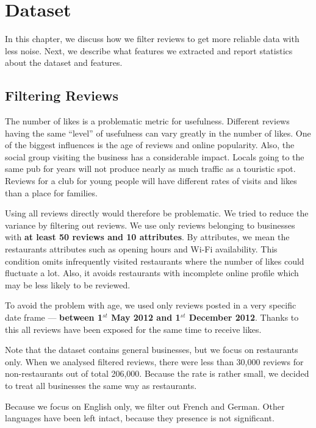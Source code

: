 \chapter{Dataset}\label{chap:dataset}

In this chapter, we discuss how we filter reviews to get more reliable data with
less noise.
Next, we describe what features we extracted
and report statistics about the dataset and features.


\section{Filtering Reviews}\label{sec:filter}


The number of likes is a problematic metric for usefulness.
Different reviews having the same ``level'' of usefulness can vary greatly
in the number of likes.
One of the biggest influences is the age of reviews and online popularity.
Also, the social group visiting the business has a considerable impact.
Locals going to the same pub for years will not produce nearly as much traffic
as a touristic spot.
Reviews for a club for young people will have different rates of visits and likes
than a place for families.

Using all reviews directly would therefore be problematic.
We tried to reduce the variance by filtering out reviews.
We use only reviews belonging to businesses with \textbf{at least 50 reviews and 10 attributes}.
By attributes, we mean the restaurants attributes such as opening hours and Wi-Fi availability.
This condition omits infrequently visited restaurants where the number of likes could fluctuate a lot.
Also, it avoids restaurants with incomplete online profile which may be less likely to be reviewed.

To avoid the problem with age, we used only reviews posted in a very specific date frame
--- \textbf{between 1$^{st}$ May 2012 and 1$^{st}$ December 2012}.
Thanks to this all reviews have been exposed for the same time to receive likes.

Note that the dataset contains general businesses, but we focus on restaurants only.
When we analysed filtered reviews,
there were less than 30,000 reviews for non-restaurants out of total 206,000.
Because the rate is rather small,
we decided to treat all businesses the same way as restaurants.

Because we focus on English only, we filter out French and German.
Other languages have been left intact, because they presence is not significant.

